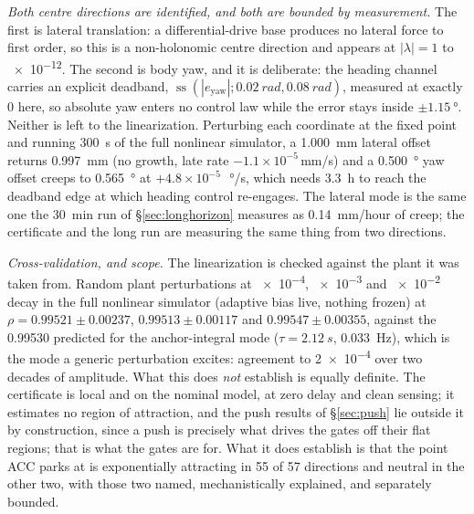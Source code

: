 \documentclass[conference]{IEEEtran}
\begin{document}
\emph{Both centre directions are identified, and both are bounded by measurement.} The first is lateral translation: a differential-drive base produces no lateral force to first order, so this is a non-holonomic centre direction and appears at $|\lambda|{=}1$ to \num{e-12}. The second is body yaw, and it is deliberate: the heading channel carries an explicit deadband, $\operatorname{ss}(|e_{\text{yaw}}|;\SI{0.02}{rad},\SI{0.08}{rad})$, measured at exactly \num{0} here, so absolute yaw enters no control law while the error stays inside $\pm\SI{1.15}{\degree}$. Neither is left to the linearization. Perturbing each coordinate at the fixed point and running \SI{300}{s} of the full nonlinear simulator, a \SI{1.000}{mm} lateral offset returns \SI{0.997}{mm} (no growth, late rate $-1.1{\times}10^{-5}$\,mm/s) and a \SI{0.500}{\degree} yaw offset creeps to \SI{0.565}{\degree} at $+4.8{\times}10^{-5}$\,\SI{}{\degree/s}, which needs \SI{3.3}{h} to reach the deadband edge at which heading control re-engages. The lateral mode is the same one the \SI{30}{min} run of \S\ref{sec:longhorizon} measures as \SI{0.14}{mm/hour} of creep; the certificate and the long run are measuring the same thing from two directions.

\emph{Cross-validation, and scope.} The linearization is checked against the plant it was taken from. Random plant perturbations at \num{e-4}, \num{e-3} and \num{e-2} decay in the full nonlinear simulator (adaptive bias live, nothing frozen) at $\rho{=}0.99521{\pm}0.00237$, $0.99513{\pm}0.00117$ and $0.99547{\pm}0.00355$, against the \num{0.99530} predicted for the anchor-integral mode ($\tau{=}\SI{2.12}{s}$, \SI{0.033}{Hz}), which is the mode a generic perturbation excites: agreement to \num{2e-4} over two decades of amplitude. What this does \emph{not} establish is equally definite. The certificate is local and on the nominal model, at zero delay and clean sensing; it estimates no region of attraction, and the push results of \S\ref{sec:push} lie outside it by construction, since a push is precisely what drives the gates off their flat regions; that is what the gates are for. What it does establish is that the point ACC parks at is exponentially attracting in \num{55} of \num{57} directions and neutral in the other two, with those two named, mechanistically explained, and separately bounded.
\end{document}
